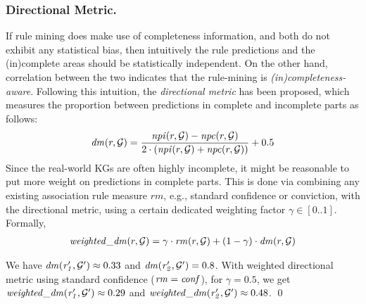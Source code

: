 \subsubsection{Directional Metric.} If rule mining does make use of completeness information, and both do not exhibit any statistical bias, then intuitively the rule predictions and the (in)complete areas should be statistically independent. On the other hand, correlation between the two indicates that the rule-mining is \emph{(in)completeness-aware}. Following this intuition, the \emph{directional metric} has been proposed, which measures the proportion between predictions in complete and incomplete parts as follows:
\begin{align*}
\mathit{dm}(r,\mathcal{G}) = \frac{\mathit{npi}(r,\mathcal{G})-\mathit{npc}(r,\mathcal{G})}{2\cdot(\mathit{npi}(r,\mathcal{G})+\mathit{npc}(r,\mathcal{G}))}+0.5
\end{align*}
Since the real-world KGs are often highly incomplete, it might be reasonable to put more weight on predictions in complete parts. This is done via %
combining any existing association rule measure $rm$, e.g., standard confidence or conviction, with 
the directional metric, using a certain dedicated weighting factor $\gamma \in [0..1]$. Formally,
\begin{align*}
\mathit{weighted\_dm}(r,\mathcal{G})=\gamma \cdot \mathit{rm}(r,\mathcal{G}) + (1-\gamma) \cdot \mathit{dm}(r,\mathcal{G}) 
\end{align*}
\begin{example}
We have $\mathit{dm(r_1',\mathcal{G}')}\approx 0.33$ and $\mathit{dm(r_2',\mathcal{G}')}=0.8$. With weighted directional metric using standard confidence ($\mathit{rm = conf}$), for $\gamma=0.5$, we get $\mathit{weighted\_dm(r_1',\mathcal{G}')} \approx 0.29$ and $\mathit{weighted\_dm(r_2',\mathcal{G}')} \approx 0.48$. \qed
\end{example}



